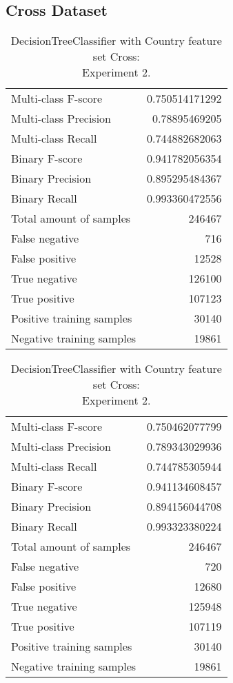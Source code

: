 \newpage
\subsection{Cross Dataset}

\begin{table}[H]
\begin{minipage}{0.5\textwidth}
\caption{DecisionTreeClassifier with Country feature set Cross: \\Experiment 1.}
\centering
\begin{tabular}{l r}
\toprule
Multi-class F-score & 0.750514171292 \\
Multi-class Precision & 0.78895469205 \\
Multi-class Recall & 0.744882682063 \\
\midrule
Binary F-score & 0.941782056354 \\
Binary Precision & 0.895295484367 \\
Binary Recall & 0.993360472556 \\
\midrule
Total amount of samples & 246467 \\
False negative & 716 \\
False positive & 12528 \\
True negative & 126100 \\
True positive & 107123 \\
\midrule
Positive training samples & 30140 \\
Negative training samples & 19861 \\
\bottomrule
\end{tabular}

\end{minipage}
\hfillx
\begin{minipage}{0.5\textwidth}
\caption{DecisionTreeClassifier with Country feature set Cross: \\Experiment 2.}
\centering
\begin{tabular}{l r}
\toprule
Multi-class F-score & 0.750462077799 \\
Multi-class Precision & 0.789343029936 \\
Multi-class Recall & 0.744785305944 \\
\midrule
Binary F-score & 0.941134608457 \\
Binary Precision & 0.894156044708 \\
Binary Recall & 0.993323380224 \\
\midrule
Total amount of samples & 246467 \\
False negative & 720 \\
False positive & 12680 \\
True negative & 125948 \\
True positive & 107119 \\
\midrule
Positive training samples & 30140 \\
Negative training samples & 19861 \\
\bottomrule
\end{tabular}
\end{minipage}
\end{table}

